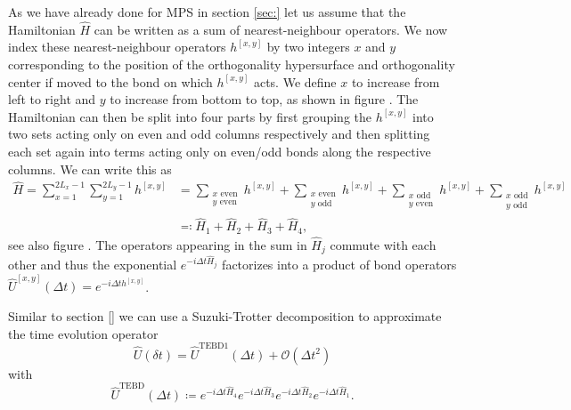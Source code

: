 As we have already done for MPS in section \ref{sec:} let us assume that the Hamiltonian $\hat{H}$ can be written as a sum of nearest-neighbour operators. We now index these nearest-neighbour operators $h^{[x, y]}$ by two integers $x$ and $y$ corresponding to the position of the orthogonality hypersurface and orthogonality center if moved to the bond on which $h^{[x, y]}$ acts. We define $x$ to increase from left to right and $y$ to increase from bottom to top, as shown in figure . The Hamiltonian can then be split into four parts by first grouping the $h^{[x,y]}$ into two sets acting only on even and odd columns respectively and then splitting each set again into terms acting only on even/odd bonds along the respective columns. We can write this as
\begin{equation}
	\label{eq:disoTPS_TEBD_splitting_local_Hamiltonian}
	\begin{split}
		\hat{H} = \sum_{x=1}^{2L_x-1} \sum_{y=1}^{2L_y-1}h^{[x,y]} &= \sum_{\substack{x\text{ even}\\y\text{ even}}} h^{[x, y]} + \sum_{\substack{x\text{ even}\\y\text{ odd}}} h^{[x, y]} + \sum_{\substack{x\text{ odd}\\y\text{ even}}} h^{[x, y]} + \sum_{\substack{x\text{ odd}\\y\text{ odd}}} h^{[x, y]} \\
		&\eqqcolon \hat{H}_1 + \hat{H}_2 + \hat{H}_3 + \hat{H}_4,
	\end{split}
\end{equation}
see also figure . The operators appearing in the sum in $\hat{H}_j$ commute with each other and thus the exponential $e^{-i\Delta t\hat{H}_j}$ factorizes into a product of bond operators $\hat{U}^{[x, y]}(\Delta t) = e^{-i\Delta th^{[x, y]}}$. \par
Similar to section \ref{} we can use a Suzuki-Trotter decomposition to approximate the time evolution operator
\begin{equation}
	\label{eq:disoTPS_TEBD_suzuki_trotter_first_order}
	\hat{U}(\delta t) = \hat{U}^\text{TEBD1}(\Delta t) + \mathcal{O}(\Delta t^2)
\end{equation}
with
\begin{equation}
	\label{eq:disoTPS_TEBD_first_order_TEBD_operator}
	\hat{U}^\text{TEBD}(\Delta t) \coloneqq e^{-i\Delta t\hat{H}_4} e^{-i\Delta t\hat{H}_3} e^{-i\Delta t\hat{H}_2} e^{-i\Delta t\hat{H}_1}.
\end{equation}

